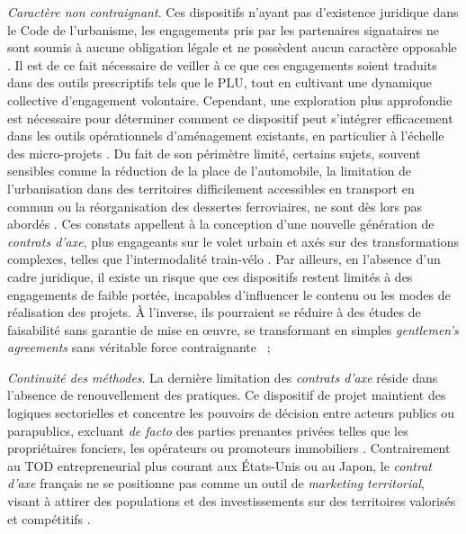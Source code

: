\begin{refsegment}
\begin{customitemize}
\item \textsl{Caractère non contraignant}. Ces dispositifs n’ayant pas d’existence juridique dans le Code de l’urbanisme, les engagements pris par les partenaires signataires ne sont soumis à aucune obligation légale et ne possèdent aucun caractère opposable \textcolor{blue}{\autocite[2]{cerema_outils_2021}}. Il est de ce fait nécessaire de veiller à ce que ces engagements soient traduits dans des outils prescriptifs tels que le \acrshort{PLU}, tout en cultivant une dynamique collective d’engagement volontaire. Cependant, une exploration plus approfondie est nécessaire pour déterminer comment ce dispositif peut s’intégrer efficacement dans les outils opérationnels d’aménagement existants, en particulier à l’échelle des micro-projets \textcolor{blue}{\autocite[53]{cerema_articuler_2015}}. Du fait de son périmètre limité, certains sujets, souvent sensibles comme la réduction de la place de l'automobile, la limitation de l’urbanisation dans des territoires difficilement accessibles en transport en commun ou la réorganisation des dessertes ferroviaires, ne sont dès lors pas abordés \textcolor{blue}{\autocite[96]{maulat_contractualiser_2015}}. Ces constats appellent à la conception d’une nouvelle génération de \textsl{contrats d’axe}, plus engageants sur le volet urbain et axés sur des transformations complexes, telles que l’\gls{intermodalité} train-vélo \textcolor{blue}{\autocite[17]{haro_ligne_2021}}. Par ailleurs, en l’absence d’un cadre juridique, il existe un risque que ces dispositifs restent limités à des engagements de faible portée, incapables d’influencer le contenu ou les modes de réalisation des projets. À l’inverse, ils pourraient se réduire à des études de faisabilité sans garantie de mise en œuvre, se transformant en simples \textsl{gentlemen’s agreements} sans véritable force contraignante \textcolor{blue}{\autocite[53]{cerema_articuler_2015}}~;
\item \textsl{Continuité des méthodes}. La dernière limitation des \textsl{contrats d’axe} réside dans l’absence de renouvellement des pratiques. Ce dispositif de projet maintient des logiques sectorielles et concentre les pouvoirs de décision entre acteurs publics ou parapublics, excluant \textsl{de facto} des parties prenantes privées telles que les propriétaires fonciers, les opérateurs ou promoteurs immobiliers \textcolor{blue}{\autocites[96]{maulat_contractualiser_2015}[2]{cerema_outils_2021}}. Contrairement au \acrshort{TOD} entrepreneurial plus courant aux États-Unis ou au Japon, le \textsl{contrat d’axe} français ne se positionne pas comme un outil de \textsl{marketing territorial}, visant à attirer des populations et des investissements sur des territoires valorisés et compétitifs \textcolor{blue}{\autocite[120]{bentayou_contrat_2015}}.%
    \end{customitemize}


\end{refsegment}
